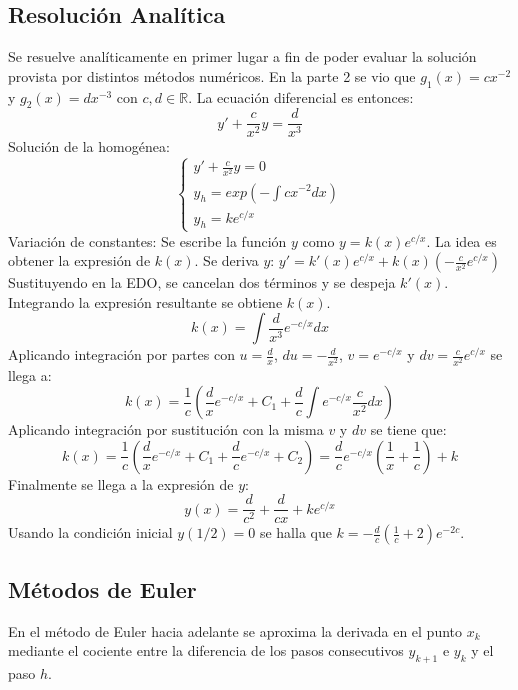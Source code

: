 \documentclass{endm}
\begin{document}
\subsection{Resolución Analítica}
Se resuelve analíticamente en primer lugar a fin de poder evaluar la solución provista por distintos métodos numéricos.
En la parte 2 se vio que $g_1(x) = cx^{-2}$ y $g_2(x) = dx^{-3}$ con $c,d \in \mathbb{R}$.
La ecuación diferencial es entonces:
\begin{equation}
    y' + \frac{c}{x^2}y = \frac{d}{x^3}
\end{equation}
Solución de la homogénea:
 \begin{equation*}
\begin{cases}
    y' + \frac{c}{x^2}y = 0 \\
    y_h = exp(-\int cx^{-2}dx) \\
    y_h = ke^{c/x}
\end{cases}
\end{equation*}
Variación de constantes:
Se escribe la función $y$ como $y = k(x)e^{c/x}$. La idea es obtener la expresión de $k(x)$.
Se deriva $y$: $y' = k'(x)e^{c/x} + k(x)\left(-\frac{c}{x^2}e^{c/x}\right)$
Sustituyendo en la EDO, se cancelan dos términos y se despeja $k'(x)$. Integrando la expresión resultante se obtiene $k(x)$.
\begin{equation}
    k(x) = \int \frac{d}{x^3}e^{-c/x}dx
\end{equation}
Aplicando integración por partes con $u = \frac{d}{x}$, $du = -\frac{d}{x^2}$, $v = e^{-c/x}$ y $dv = \frac{c}{x^2}e^{c/x}$ se llega a:
\begin{equation}
    k(x) = \frac{1}{c}\left( \frac{d}{x}e^{-c/x} + C_1 + \frac{d}{c}\int e^{-c/x}\frac{c}{x^2}dx \right)
\end{equation}
Aplicando integración por sustitución con la misma $v$ y $dv$ se tiene que:
\begin{equation}
    k(x) = \frac{1}{c}\left( \frac{d}{x}e^{-c/x} + C_1 + \frac{d}{c}e^{-c/x} + C_2 \right) =
    \frac{d}{c}e^{-c/x}\left( \frac{1}{x} + \frac{1}{c} \right) + k
\end{equation}
Finalmente se llega a la expresión de $y$:
\begin{equation}
    y(x) = \frac{d}{c^2} + \frac{d}{cx}+ ke^{c/x}
\end{equation}
Usando la condición inicial $y(1/2) = 0$ se halla que $k = -\frac{d}{c}\left( \frac{1}{c} + 2 \right)e^{-2c}$.

\subsection{Métodos de Euler}
En el método de Euler hacia adelante se aproxima la derivada en el punto $x_{k}$ mediante el cociente entre la diferencia de los pasos consecutivos $y_{k+1}$ e $y_{k}$ y el paso $h$.
\end{document}
